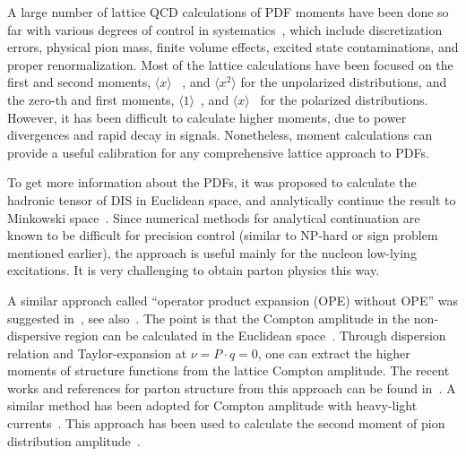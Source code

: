 \documentclass[aps,rmp,reprint,amsmath,amssymb,graphicx,longbibliography]{revtex4-1} %
\begin{document}
A large number of lattice QCD calculations of PDF moments have been done
so far with various degrees of control in systematics~\cite{Lin:2017snn},
which include discretization errors,
physical pion mass, finite volume effects, excited state contaminations,
and proper renormalization. Most of the lattice calculations
have been focused on the first and second moments, $\langle x\rangle$
~\cite{Green:2012ud,Alexandrou:2017oeh,Bali:2014gha},
and $\langle x^2\rangle$\cite{Dolgov:2002zm,Deka:2008xr} for the unpolarized distributions,
and the zero-th and first moments, $\langle 1\rangle$~\cite{Gong:2015iir,Alexandrou:2017oeh,Chang:2018uxx,Alexandrou:2019brg},
and $\langle x\rangle$~\cite{Aoki:2010xg,Abdel-Rehim:2015owa} for the polarized distributions.
However, it has been difficult to
calculate higher moments, due to power divergences
and rapid decay in signals. Nonetheless, moment calculations can provide a useful
calibration for any comprehensive lattice approach to PDFs.

To get more information about the PDFs, it was proposed to
calculate the hadronic tensor of DIS in Euclidean space, and analytically continue the result
to Minkowski space~\cite{Liu:1993cv,Liu:1998um,
	Liu:1999ak,Liu:2016djw,Liu:2017lpe,Liu:2020okp}. Since numerical methods for
analytical continuation are known to be difficult for precision control (similar to NP-hard
or sign problem mentioned earlier), the approach
is useful mainly for the nucleon low-lying excitations. It is very challenging
to obtain parton physics this way.

A similar approach called ``operator product expansion (OPE) without OPE'' was suggested in~\cite{Aglietti:1998ur,Martinelli:1998hz}, see also~\cite{Dawson:1997ic,Capitani:1998fe,Capitani:1999fm}.
The point is that the Compton amplitude in the non-dispersive region
can be calculated in the Euclidean space~\cite{Ji:2001wha}. Through dispersion
relation and Taylor-expansion at $\nu = P\cdot q=0$, one can extract
the higher moments of structure functions from the lattice Compton amplitude.
The recent works and references for parton structure from this approach can be found in~\cite{Chambers:2017dov,Hannaford-Gunn:2020pvu,Horsley:2020ltc}.
A similar method has been adopted for Compton amplitude with heavy-light
currents~\cite{Detmold:2005gg}.
This approach has been used to calculate the second moment of pion distribution amplitude~\cite{Detmold:2018kwu,Detmold:2020lev}.
\end{document}
